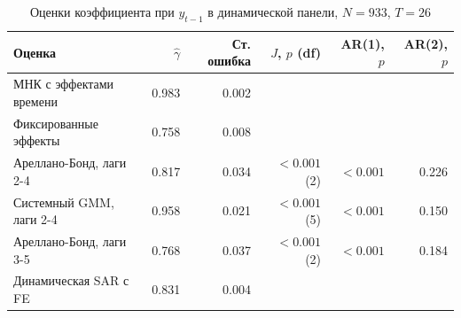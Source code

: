 \documentclass[12pt, a4paper]{article}
\begin{document}
\begin{table}[H]
    \centering
    \footnotesize
    \caption{Оценки коэффициента при $y_{t-1}$ в динамической панели, $N = 933$, $T = 26$}
    \label{tab:dynamic}
    \begin{tabular}{lrrrrr}
        \toprule
        \textbf{Оценка} & \textbf{$\hat{\gamma}$} & \textbf{Ст. ошибка} & \textbf{$J$, $p$ (df)} & \textbf{AR(1), $p$} & \textbf{AR(2), $p$} \\
        \midrule
        МНК с эффектами времени & 0.983 & 0.002 & & & \\
        Фиксированные эффекты & 0.758 & 0.008 & & & \\
        Ареллано-Бонд, лаги 2-4 & 0.817 & 0.034 & $< 0.001$ (2) & $< 0.001$ & 0.226 \\
        Системный GMM, лаги 2-4 & 0.958 & 0.021 & $< 0.001$ (5) & $< 0.001$ & 0.150 \\
        Ареллано-Бонд, лаги 3-5 & 0.768 & 0.037 & $< 0.001$ (2) & $< 0.001$ & 0.184 \\
        Динамическая SAR с FE & 0.831 & 0.004 & & & \\
        \bottomrule
    \end{tabular}
    \par{}
\end{table}
\end{document}
